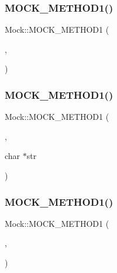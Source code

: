 \mbox{\label{classMock_ada59eea6991953353f332e3ea1e74444}} 
\subsubsection{\texorpdfstring{MOCK\_METHOD1()}{MOCK\_METHOD1()}\hspace{0.1cm}{\footnotesize\ttfamily [1/9]}}
{\footnotesize\ttfamily Mock\+::\+M\+O\+C\+K\+\_\+\+M\+E\+T\+H\+O\+D1 (\begin{DoxyParamCaption}\item[{\mbox{\hyperlink{classInterface_a65d6ae604e7e9a513aec72c9c94e0b97}{Void\+From\+String}}}]{,  }\item[{void(char $\ast$str)}]{ }\end{DoxyParamCaption})}

\mbox{\label{classMock_a2db4d82b6f92b4e462929f651ac4c3b1}} 
\subsubsection{\texorpdfstring{MOCK\_METHOD1()}{MOCK\_METHOD1()}\hspace{0.1cm}{\footnotesize\ttfamily [2/9]}}
{\footnotesize\ttfamily Mock\+::\+M\+O\+C\+K\+\_\+\+M\+E\+T\+H\+O\+D1 (\begin{DoxyParamCaption}\item[{\mbox{\hyperlink{classInterface_a756b1d22c12aa3f14a5083f90043fbf0}{String\+From\+String}}}]{,  }\item[{char $\ast$}]{char $\ast$str }\end{DoxyParamCaption})}

\mbox{\label{classMock_ae73b4ee90bf6d84205d2b1c17f0b8433}} 
\subsubsection{\texorpdfstring{MOCK\_METHOD1()}{MOCK\_METHOD1()}\hspace{0.1cm}{\footnotesize\ttfamily [3/9]}}
{\footnotesize\ttfamily Mock\+::\+M\+O\+C\+K\+\_\+\+M\+E\+T\+H\+O\+D1 (\begin{DoxyParamCaption}\item[{\mbox{\hyperlink{classInterface_ab34c8a5fd2236a6b009f86a4e5851b61}{Int\+From\+String}}}]{,  }\item[{int(char $\ast$str)}]{ }\end{DoxyParamCaption})}


